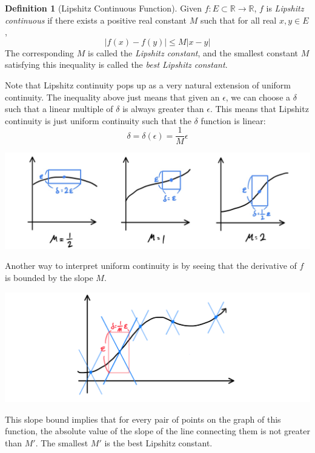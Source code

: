 \documentclass{article}
\theoremstyle{remark}
\theoremstyle{definition}
\newtheorem{definition}{Definition}[section]
\begin{document}
\begin{definition}[Lipshitz Continuous Function]
Given $f: E \subset \mathbb{R} \longrightarrow \mathbb{R}$, $f$ is \textit{Lipshitz continuous} if there exists a positive real constant $M$ such that for all real $x, y \in E$, 
\[\big| f(x) - f(y) \big| \leq M \big| x - y \big|\]
The corresponding $M$ is called the \textit{Lipshitz constant}, and the smallest constant $M$ satisfying this inequality is called the \textit{best Lipshitz constant}. 

Note that Lipshitz continuity pops up as a very natural extension of uniform continuity. The inequality above just means that given an $\epsilon$, we can choose a $\delta$ such that a linear multiple of $\delta$ is always greater than $\epsilon$. This means that Lipshitz continuity is just uniform continuity such that the $\delta$ function is linear:  
\[\delta = \delta(\epsilon) = \frac{1}{M} \epsilon\]
\begin{center}
    \includegraphics[scale=0.3]{img/Lipshitz_Continuity.jpg}
\end{center}
\end{definition}

Another way to interpret uniform continuity is by seeing that the derivative of $f$ is bounded by the slope $M$. 
\begin{center}
    \includegraphics[scale=0.3]{img/Lipshitz_Continuity_Slope_Bound.PNG}
\end{center}
This slope bound implies that for every pair of points on the graph of this function, the absolute value of the slope of the line connecting them is not greater than $M'$. The smallest $M'$ is the best Lipshitz constant. 
\end{document}
